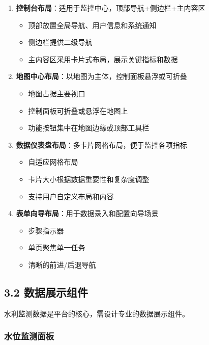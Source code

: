 \begin{enumerate}
\def\labelenumi{\arabic{enumi}.}
\tightlist
\item
  \textbf{控制台布局}：适用于监控中心，顶部导航+侧边栏+主内容区

  \begin{itemize}
  \tightlist
  \item
    顶部放置全局导航、用户信息和系统通知
  \item
    侧边栏提供二级导航
  \item
    主内容区采用卡片式布局，展示关键指标和数据
  \end{itemize}
\item
  \textbf{地图中心布局}：以地图为主体，控制面板悬浮或可折叠

  \begin{itemize}
  \tightlist
  \item
    地图占据主要视口
  \item
    控制面板可折叠或悬浮在地图上
  \item
    功能按钮集中在地图边缘或顶部工具栏
  \end{itemize}
\item
  \textbf{数据仪表盘布局}：多卡片网格布局，便于监控各项指标

  \begin{itemize}
  \tightlist
  \item
    自适应网格布局
  \item
    卡片大小根据数据重要性和复杂度调整
  \item
    支持用户自定义布局和内容
  \end{itemize}
\item
  \textbf{表单向导布局}：用于数据录入和配置向导场景

  \begin{itemize}
  \tightlist
  \item
    步骤指示器
  \item
    单页聚焦单一任务
  \item
    清晰的前进/后退导航
  \end{itemize}
\end{enumerate}

\subsection{3.2
数据展示组件}\label{ux6570ux636eux5c55ux793aux7ec4ux4ef6}

水利监测数据是平台的核心，需设计专业的数据展示组件。

\subsubsection{水位监测面板}\label{ux6c34ux4f4dux76d1ux6d4bux9762ux677f}

